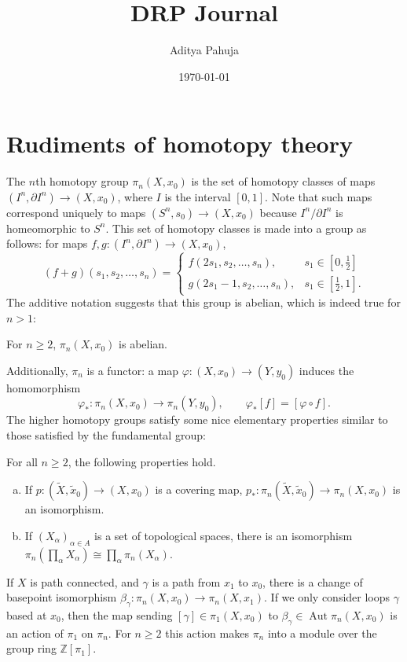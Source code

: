 \documentclass[10pt]{article}
\title{\vspace{-2.0cm}DRP Journal}
\author{\large Aditya Pahuja}
\date{\large \today}
\providecommand{\half}{\frac{1}{2}}
\providecommand{\ZZ}{\mathbb Z}
\providecommand{\ii}{\item}
\begin{document}
\maketitle
\tableofcontents
\pagebreak

\section{Rudiments of homotopy theory}
The $n$th homotopy group $\pi_n(X,x_0)$ is the set of homotopy classes
of maps $(I^n,\partial I^n)\to(X,x_0)$, where $I$ is the interval $[0,1]$.
Note that such maps correspond uniquely to maps $(S^n,s_0)\to(X,x_0)$
because $I^n/\partial I^n$ is homeomorphic to $S^n$.
This set of homotopy classes is made into a group as follows:
for maps $f,g\colon(I^n,\partial I^n)\to(X,x_0)$,
\begin{equation*}
    (f+g)(s_1,s_2,\dots,s_n) = \begin{cases}
	f(2s_1,s_2,\dots,s_n), & s_1\in[0,\half]\\
	g(2s_1-1,s_2,\dots,s_n), & s_1\in[\half,1].
    \end{cases}
\end{equation*}
The additive notation suggests that this group is abelian,
which is indeed true for $n > 1$:

\begin{prop}
    \label{prop:homotopy-groups-abelian}
    For $n\ge 2$, $\pi_n(X,x_0)$ is abelian.
\end{prop}

Additionally, $\pi_n$ is a functor: a map $\varphi\colon(X,x_0)\to(Y,y_0)$
induces the homomorphism
\[
    \varphi_*\colon\pi_n(X,x_0)\to\pi_n(Y,y_0),\qquad
    \varphi_*[f] = [\varphi\circ f].
\]
The higher homotopy groups satisfy some nice elementary properties
similar to those satisfied by the fundamental group:
\begin{prop}
    For all $n\ge 2$, the following properties hold.
    \label{prop:pi-n-props}
    \begin{enumerate}[(a)]
        \ii If $p\colon(\widetilde X,\widetilde x_0)\to(X,x_0)$
	is a covering map, $p_*\colon\pi_n(\widetilde X,\widetilde x_0)
	\to\pi_n(X,x_0)$ is an isomorphism.
	\ii If $(X_\alpha)_{\alpha\in A}$ is a set of topological spaces,
	there is an isomorphism
	$\pi_n(\prod_\alpha X_\alpha) \cong \prod_\alpha\pi_n(X_\alpha)$.
    \end{enumerate}
\end{prop}

If $X$ is path connected,
and $\gamma$ is a path from $x_1$ to $x_0$,
there is a change of basepoint isomorphism
$\beta_\gamma\colon\pi_n(X,x_0)\to\pi_n(X,x_1)$.
If we only consider loops $\gamma$ based at $x_0$,
then the map sending $[\gamma]\in\pi_1(X,x_0)$ to
$\beta_\gamma\in\operatorname{Aut}\pi_n(X,x_0)$ is
an action of $\pi_1$ on $\pi_n$.
For $n\ge 2$ this action makes $\pi_n$ into a
module over the group ring $\ZZ[\pi_1]$.
\end{document}
